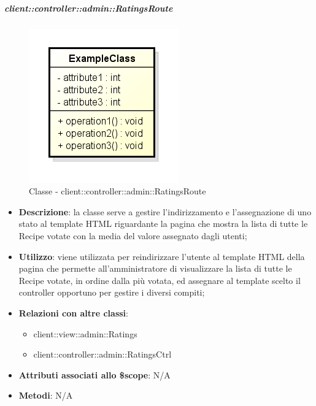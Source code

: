 		\subparagraph{client::controller::admin::RatingsRoute} %
		\label{subp:bdsm_app_client_controller_admin_ratingsroute}
			\begin{figure}[htbp]
				\centering
				\centerline{\includegraphics[scale=0.7]{./images/client/classes/example_class.png}}
				\caption{Classe - client::controller::admin::RatingsRoute}
			\end{figure}
			\begin{itemize}
				\item \textbf{Descrizione}: la classe serve a gestire l'indirizzamento e l'assegnazione di uno stato al template HTML riguardante la pagina che mostra la lista di tutte le Recipe votate con la media del valore assegnato dagli utenti;
				\item \textbf{Utilizzo}: viene utilizzata per reindirizzare l'utente al template HTML della pagina che permette all'amministratore di visualizzare la lista di tutte le Recipe votate, in ordine dalla più votata, ed assegnare al template scelto il controller opportuno per gestire i diversi compiti;
				\item \textbf{Relazioni con altre classi}:
					\begin{itemize}
						\item client::view::admin::Ratings
						\item client::controller::admin::RatingsCtrl
					\end{itemize}
				\item \textbf{Attributi associati allo \$scope}: N/A
				\item \textbf{Metodi}: N/A
			\end{itemize}

